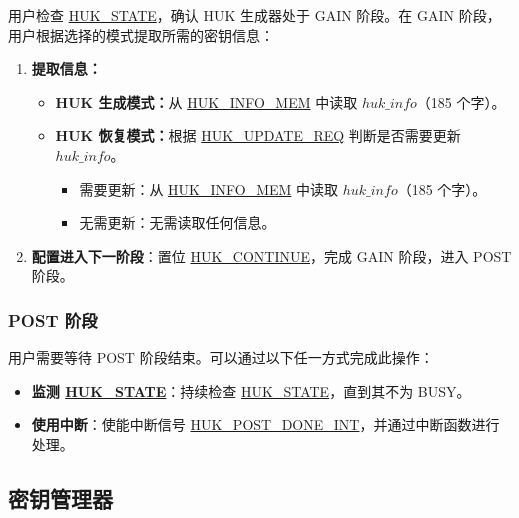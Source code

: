 \documentclass[main\_\_CN.tex]{subfiles}
\begin{document}
用户检查 \hyperref[fielddesc:HUKSTATE]{HUK\_STATE}，确认 HUK 生成器处于 GAIN 阶段。在 GAIN 阶段，用户根据选择的模式提取所需的密钥信息：
\begin{enumerate}
    \item \textbf{提取信息：}
    \begin{itemize}
        \item \textbf{HUK 生成模式：}从 \hyperref[mem:huk-info]{HUK\_INFO\_MEM} 中读取 \hyperref[para:hukinfo]{\begin{math}huk\_info\end{math}}（185 个字）。
        \item \textbf{HUK 恢复模式：}根据 \hyperref[fielddesc:HUKUPDATEREQ]{HUK\_UPDATE\_REQ} 判断是否需要更新 \hyperref[para:hukinfo]{\begin{math}huk\_info\end{math}}。
        \begin{itemize}
            \item 需要更新：从 \hyperref[mem:huk-info]{HUK\_INFO\_MEM} 中读取 \hyperref[para:hukinfo]{\begin{math}huk\_info\end{math}}（185 个字）。
            \item 无需更新：无需读取任何信息。
        \end{itemize}
    \end{itemize}
    \item \textbf{配置进入下一阶段}：置位 \hyperref[fielddesc:HUKCONTINUE]{HUK\_CONTINUE}，完成 GAIN 阶段，进入 POST 阶段。
\end{enumerate}

\subsubsection{POST 阶段}

用户需要等待 POST 阶段结束。可以通过以下任一方式完成此操作：
\begin{itemize}
    \item \textbf{监测 \hyperref[fielddesc:HUKSTATE]{HUK\_STATE}}：持续检查 \hyperref[fielddesc:HUKSTATE]{HUK\_STATE}，直到其不为 BUSY。
    \item \textbf{使用中断}：使能中断信号 \hyperref[int:HUKPOSTDONEINT]{HUK\_POST\_DONE\_INT}，并通过中断函数进行处理。
\end{itemize}


\subsection{密钥管理器}
\end{document}
